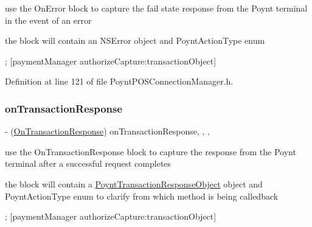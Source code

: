 use the On\+Error block to capture the fail state response from the Poynt terminal in the event of an error 

the block will contain an N\+S\+Error object and Poynt\+Action\+Type enum


\begin{DoxyCode}
;
[paymentManager authorizeCapture:transactionObject]
\end{DoxyCode}
 

Definition at line 121 of file Poynt\+P\+O\+S\+Connection\+Manager.\+h.

\hypertarget{interface_poynt_p_o_s_connection_manager_aec722c6cb0f961265852a406242c430b}{}\label{interface_poynt_p_o_s_connection_manager_aec722c6cb0f961265852a406242c430b} 
\subsubsection{\texorpdfstring{on\+Transaction\+Response}{onTransactionResponse}}
{\footnotesize\ttfamily -\/ (\hyperlink{_poynt_p_o_s_connection_manager_8h_ae268209596a83d1d61f8ce4f2513d800}{On\+Transaction\+Response}) on\+Transaction\+Response\hspace{0.3cm}{\ttfamily [read]}, {\ttfamily [write]}, {\ttfamily [atomic]}, {\ttfamily [copy]}}



use the On\+Transaction\+Response block to capture the response from the Poynt terminal after a successful request completes 

the block will contain a \hyperlink{interface_poynt_transaction_response_object}{Poynt\+Transaction\+Response\+Object} object and Poynt\+Action\+Type enum to clarify from which method is being calledback


\begin{DoxyCode}
[paymentManager setOnTransactionResponse:^void(\hyperlink{interface_poynt_transaction_response_object}{PoyntTransactionResponseObject}
       *data,\hyperlink{_poynt_p_o_s_connection_manager_8h_a9d1a2639d9b9775a21d4c181160e7af7}{PoyntActionType} actionType)\{
   \textcolor{keywordflow}{if}(actionType == \hyperlink{_poynt_p_o_s_connection_manager_8h_a9d1a2639d9b9775a21d4c181160e7af7aadbbca3ad6fc42c73fa7c69608f0a4d7}{AuthorizePair})\{
       \textcolor{comment}{// ... handle this case}
   \}\textcolor{keywordflow}{else}\{
       NSLog(\textcolor{stringliteral}{@"success for %
   \}
\}];
[paymentManager authorizeCapture:transactionObject]
\end{DoxyCode}
 

